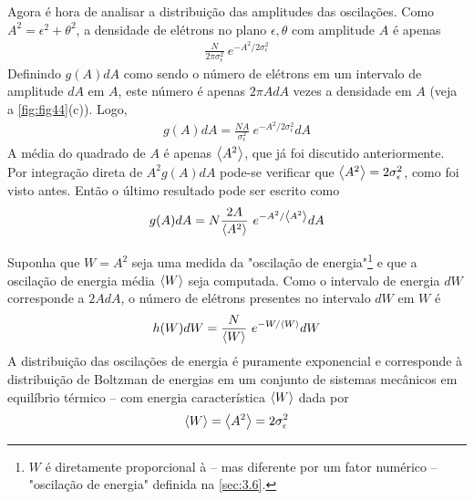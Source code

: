 Agora é hora de analisar a distribuição das amplitudes das oscilações. Como $A^2 = \epsilon^2 + \theta^2$, a densidade de elétrons no plano $\epsilon, \theta$ com amplitude $A$ é apenas
\begin{align}
	\frac{N}{2\pi \sigma_\epsilon^2}\ e^{-A^2/2\sigma_\epsilon^2}
\end{align}
Definindo $g(A)dA$ como sendo o número de elétrons em um intervalo de amplitude $dA$ em $A$, este número é apenas $2\pi AdA$ vezes a densidade em $A$ (veja a \autoref{fig:fig44}(c)). Logo,
\begin{align}
	g(A)dA = \frac{N A}{\sigma_\epsilon^2}\ e^{-A^2/2\sigma_\epsilon^2}dA
\end{align}
A média do quadrado de $A$ é apenas $\left< A^2 \right>$, que já foi discutido anteriormente. Por integração direta de $A^2 g(A)dA$ pode-se verificar que $\left< A^2 \right> = 2\sigma_\epsilon^2$, como foi visto antes. Então o último resultado pode ser escrito como
\begin{align}
	g(A)dA = N\frac{2A}{\left< A^2 \right>}\ e^{-A^2/\left< A^2 \right>}dA
\end{align}

Suponha que $W=A^2$ seja uma medida da "oscilação de energia"\footnote{$W$ é diretamente proporcional à -- mas diferente por um fator numérico -- "oscilação de energia" definida na \autoref{sec:3.6}.} e que a oscilação de energia média $\left< W \right>$ seja computada. Como o intervalo de energia $dW$ corresponde a $2AdA$, o número de elétrons presentes no intervalo $dW$ em $W$ é
\begin{align}
	h(W)dW = \frac{N}{\left< W \right>}\ e^{-W/\left< W \right>}dW
\end{align}
A distribuição das oscilações de energia é puramente exponencial e corresponde à distribuição de Boltzman de energias em um conjunto de sistemas mecânicos em equilíbrio térmico -- com energia característica $\left< W \right>$ dada por
\begin{align}
	\left< W \right> = \left< A^2 \right> = 2\sigma_\epsilon^2
\end{align}